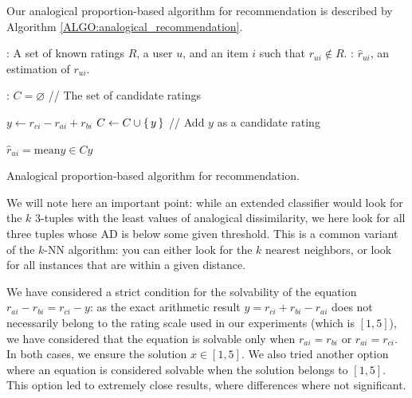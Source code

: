 Our analogical proportion-based algorithm for recommendation is described by
Algorithm \ref{ALGO:analogical_recommendation}.
 \begin{algorithm}[!ht]
       \begin{algorithmic}

      : A set of known ratings $R$, a user $u$, and an item
         $i$ such that $r_{ui} \notin R$.
      : $\hat{r}_{ui}$, an estimation of $r_{ui}$.

      :
      \STATE $C = \varnothing$ \quad \quad // The set of candidate ratings

      \STATE  $y \leftarrow r_{ci} - r_{ai} + r_{bi}$
      \STATE $C \gets C \cup \set{y}$ \quad // Add $y$ as a candidate rating
	  \ENDFOR

         \STATE $\hat{r}_{ui} = \text{mean}{y \in C} y$

\end{algorithmic}
     \caption{Analogical proportion-based algorithm for recommendation.}
       \label{ALGO:analogical_recommendation}
\end{algorithm}

We will note here an important point: while an extended classifier would look
for the $k$ $3$-tuples with the least values of analogical dissimilarity, we
here look for all three tuples whose AD is below some given threshold. This is
a common variant of the $k$-NN algorithm: you can either look for the $k$
nearest neighbors, or look for all instances that are within a given distance.

We have considered a strict condition for the solvability of the equation
$r_{ai} - r_{bi} = r_{ci} - y$: as the exact arithmetic result $y=r_{ci} +
r_{bi} -r_{ai}$ does not necessarily belong to the rating scale used in our
experiments (which is $[1,5]$), we have
considered that the equation is solvable only when $r_{ai}=r_{bi}$ or
$r_{ai}=r_{ci}$. In both cases, we ensure the solution $x \in
[1,5]$. We also tried another option where an equation is considered solvable
when the solution belongs to $[1, 5]$. This option led to extremely close
results, where differences where not significant.

